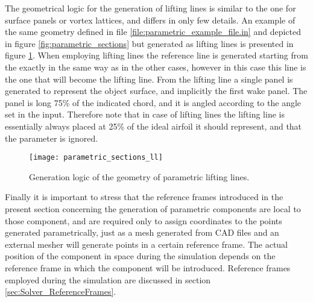 The geometrical logic for the generation of lifting lines is similar to the one for surface panels 
or vortex lattices, and differs in only few details. An example of the same geometry defined in 
file \ref{file:parametric_example_file.in} and depicted in figure \ref{fig:parametric_sections} 
but generated as lifting lines is presented in figure \ref{fig:parametric_sections_ll}. 
When employing lifting lines the reference line is generated starting from the 
 exactly in the same way as in the other cases, however 
in this case this line is the one that will become the lifting line. From the lifting 
line a single panel is generated to represent the object surface, and implicitly the 
first wake panel. The panel is long 75\% of the indicated chord, and it is angled according 
to the  angle set in the input. Therefore note that in case of lifting lines the 
lifting line is essentially always placed at 25\% of the ideal airfoil it should represent, 
and that the parameter  is ignored. 

\begin{figure}[h]
\centering
\texttt{[image: parametric\_sections\_ll]}
\caption{Generation logic of the geometry of parametric lifting lines.}
\label{fig:parametric_sections_ll}
\end{figure}

Finally it is important to stress that the reference frames introduced in the present section 
concerning the generation of parametric components are local to those component, and are required 
only to assign coordinates to the points generated parametrically, just as a mesh generated from 
CAD files and an external mesher will generate points in a certain reference frame. 
The actual position of the component in space during the simulation depends on the reference 
frame in which the component will be introduced. Reference frames employed during the simulation 
are discussed in section \ref{sec:Solver_ReferenceFrames}.

